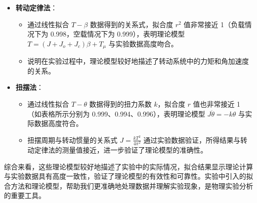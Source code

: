 \documentclass[UTF8]{ctexart}
\begin{document}
\begin{itemize}
    \item \textbf{转动定律法}：
        \begin{itemize}
            \item 通过线性拟合 \(T - \beta\) 数据得到的关系式，拟合度 \(r^2\) 值非常接近 1（负载情况下为 0.998，空载情况下为 0.999），表明理论模型 \(T = (J + J_o + J_c)\beta + T_{\mu}\) 与实验数据高度吻合。
            \item 说明在实验过程中，理论模型较好地描述了转动系统中的力矩和角加速度的关系。
        \end{itemize}
    \item \textbf{扭摆法}：
        \begin{itemize}
            \item 通过线性拟合 \(T - \theta\) 数据得到的扭力系数 \(k\)，拟合度 \(r\) 值也非常接近 1（如表格所示分别为 0.999、0.994、0.996），表明理论模型 \(J \ddot{\theta} = -k \theta\) 与实际数据高度符合。
            \item 扭摆周期与转动惯量的关系式 \(J = \frac{k T^2}{4 \pi^2}\) 通过实验数据验证，所得结果与转动定律法的测量值接近，进一步验证了理论模型的准确性。
        \end{itemize}
\end{itemize}

综合来看，这些理论模型较好地描述了实验中的实际情况，拟合结果显示理论计算与实验数据具有高度一致性，验证了理论模型的有效性和可靠性。实验中引入的拟合方法和理论模型，帮助我们更准确地处理数据并理解实验现象，是物理实验分析的重要工具。
\end{document}
